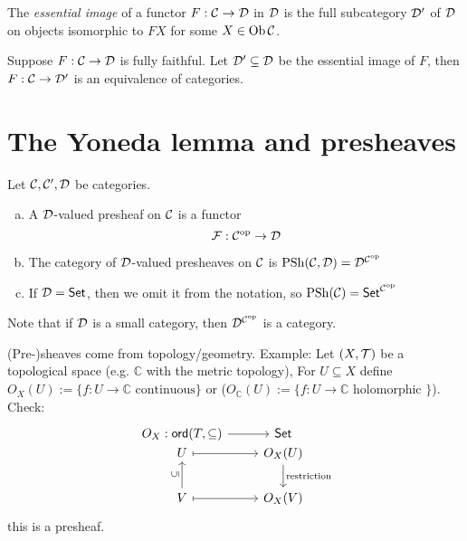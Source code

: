 \documentclass[a4paper]{report}
\begin{document}
\begin{defi}
The \emph{essential image} of a functor $F: \mathcal{C} \to \mathcal{D}$ in $\mathcal{D}$ is the full subcategory $\mathcal{D}'$ of $\mathcal{D}$ on objects isomorphic to $FX$ for some $X \in \operatorname{Ob} \mathcal{C}$.
\end{defi}
\begin{cor}
  Suppose $F: \mathcal{C} \to \mathcal{D}$ is fully faithful. Let $\mathcal{D}' \subseteq \mathcal{D}$ be the essential image of $F$, then $F: \mathcal{C} \to \mathcal{D}'$ is an equivalence of categories.
\end{cor}

\section{The Yoneda lemma and presheaves}
Let $\mathcal{C}, \mathcal{C}', \mathcal{D}$ be categories.
\begin{defi}
  \begin{enumerate}[(a)]
    \item A $\mathcal{D}$-valued presheaf on $\mathcal{C}$ is a functor \[\mathcal F: \mathcal{C}^\text{op} \to \mathcal{D}\]
    \item The category of $\mathcal{D}$-valued presheaves on $\mathcal{C}$ is $\mathrm{PSh}(\mathcal{C},\mathcal{D}) = \mathcal{D}^{\mathcal{C}^\text{op}}$
          \item If $\mathcal{D} = \mathsf{Set}$, then we omit it from the notation, so $\mathrm{PSh}(\mathcal{C}) = \mathsf{Set}^{\mathcal{C}^\text{op}}$
  \end{enumerate}
Note that if $\mathcal{D}$ is a small category, then $\mathcal{D}^{\mathcal{C}^\text{op}}$ is a category.
\end{defi}
\begin{rem*}
  (Pre-)sheaves come from topology/geometry. Example: Let $(X,\mathcal{T})$ be a topological space (e.g. $\mathbb C$ with the metric topology), For $U \subseteq X$ define $O_{X}(U):= \{f: U \to \mathbb C\text{ continuous}\}$ or ($O_{\mathbb C}(U):= \{f: U \to \mathbb C \text{ holomorphic }\}$). Check:
  \[\begin{tikzcd}
{O_X: \mathsf{ord}(T, \subseteq)}\arrow[r]                           & \Set                                   \\[-20pt]
U \arrow[r, maps to]                                        & O_X(U) \arrow[d, "\text{restriction}"] \\
V \arrow[u, "\vsubseteq"] \arrow[r, maps to] & O_X(V)
\end{tikzcd}
  \]this is a presheaf.
\end{rem*}
\end{document}
